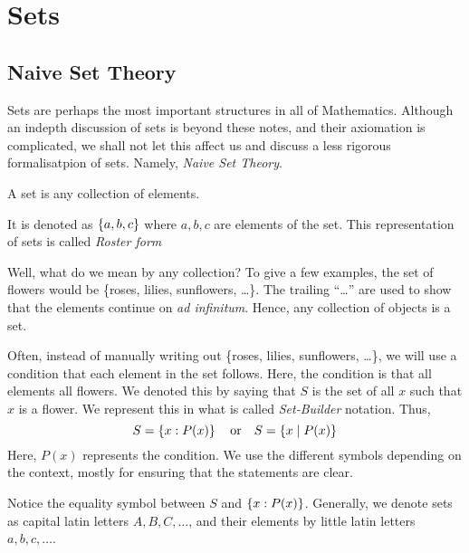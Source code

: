 \chapter{Sets}


\section{Naive Set Theory}


Sets are perhaps the most important structures in all of Mathematics. Although
an indepth discussion of sets is beyond these notes, and their axiomation is complicated, we 
shall not let this affect us and discuss a less rigorous formalisatpion of sets. 
Namely, \emph{Naive Set Theory}.


\begin{definition}
    A set is any collection of elements.

    It is denoted as \(\left\{a,b,c\right\}\) where \(a,b, c\) are elements of the set.
    This representation of sets is called \emph{Roster form}
\end{definition}

Well, what do we mean by any collection? To give a few examples, the set of flowers
would be \{roses, lilies, sunflowers, \dots\}. The trailing ``{\dots}'' are used to show
that the elements continue on \emph{ad infinitum}. Hence, any collection of objects is a set.

Often, instead of manually writing out \{roses, lilies, sunflowers, \dots\}, we will
use a condition that each element in the set follows. Here, the condition is that all
elements all flowers. We denoted this by saying that \(S\) is the set of all \(x\) such that 
\(x\) is a flower. We represent this in what is called \emph{Set-Builder} notation. Thus,
\[S = \left\{x : P(x)\right\} \quad \text{or} \quad S = \{x \mid P(x)\}\] 
Here, \( P(x)\) represents the condition. We use the different symbols depending on the context,
mostly for ensuring that the statements are clear.

\begin{remark}
    Notice the equality symbol between \(S\) and \(\left\{x : P(x)\right\}\). Generally, we denote sets
    as capital latin letters \(A, B, C, \dots\), and their elements by little latin
    letters \(a, b, c, \dots\).
\end{remark}


